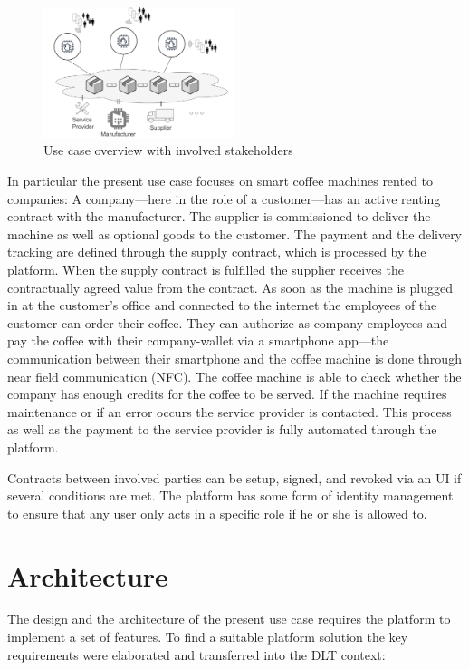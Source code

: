\documentclass[conference]{IEEEtran}
\begin{document}
\begin{figure}[hbt]
\centering
\includegraphics[width=0.5\textwidth]{overview.png}
\caption{Use case overview with involved stakeholders}
\label{fig:overview}
\end{figure}

In particular the present use case focuses on smart coffee machines rented to companies: A company---here in the role of a customer---has an active renting contract with the manufacturer. The supplier is commissioned to deliver the machine as well as optional goods to the customer. The payment and the delivery tracking are defined through the supply contract, which is processed by the platform. When the supply contract is fulfilled the supplier receives the contractually agreed value from the contract. As soon as the machine is plugged in at the customer's office and connected to the internet the employees of the customer can order their coffee. They can authorize as company employees and pay the coffee with their company-wallet via a smartphone app---the communication between their smartphone and the coffee machine is done through near field communication (NFC). The coffee machine is able to check whether the company has enough credits for the coffee to be served. If the machine requires maintenance or if an error occurs the service provider is contacted. This process as well as the payment to the service provider is fully automated through the platform.

Contracts between involved parties can be setup, signed, and revoked via an UI if several conditions are met. The platform has some form of identity management to ensure that any user only acts in a specific role if he or she is allowed to. 

%
\section{Architecture}

The design and the architecture of the present use case requires the platform to implement a set of features. To find a suitable platform solution the key requirements were elaborated and transferred into the DLT context:
\end{document}
